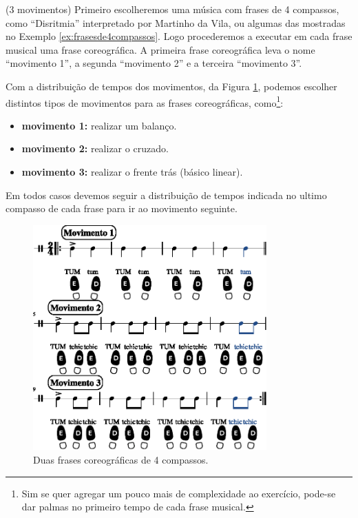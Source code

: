 \begin{example}(3 movimentos)
Primeiro escolheremos uma música com frases de 4 compassos, 
como ``Disritmia'' interpretado por Martinho da Vila,
ou algumas das mostradas no Exemplo \ref{ex:frasesde4compassos}.
Logo procederemos a executar em cada frase musical uma frase coreográfica.
A primeira frase coreográfica leva o nome ``movimento 1'', 
a segunda ``movimento 2''  e a terceira ``movimento 3''.


Com a distribuição de tempos dos movimentos, da Figura \ref{fig:frasecoreografica2a}, 
podemos escolher distintos tipos de movimentos para as frases coreográficas, 
como\footnote{Sim 
se quer agregar um pouco mais de complexidade ao exercício,
pode-se dar palmas no primeiro tempo de cada frase musical.}:
\begin{itemize}
\item \textbf{movimento 1:} realizar um balanço.
\item \textbf{movimento 2:} realizar o cruzado.
\item \textbf{movimento 3:} realizar o frente trás (básico linear).
\end{itemize}
Em todos casos devemos seguir a distribuição de tempos indicada no ultimo compasso de cada frase para ir ao movimento seguinte.

\end{example}

\begin{figure}[!h]
    \centering
    \includegraphics[width=0.8\textwidth]{chapters/cap-musicalidade/treino-fraseio2a-1.eps}
    \caption{Duas frases coreográficas de 4 compassos.}
    \label{fig:frasecoreografica2a}
\end{figure}

